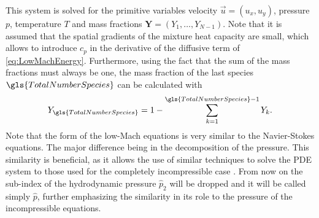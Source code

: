 This system is solved for the primitive variables velocity $\vec{u} = (u_x, u_y)$, pressure $p$, temperature $T$ and mass fractions ${\mathbf{Y} = (Y_1,\dots,Y_{N-1})}$. Note that it is assumed that the spatial gradients of the mixture heat capacity are small, which allows to introduce $c_p$ in the derivative of the diffusive term of \cref{eq:LowMachEnergy}. Furthermore, using the fact that the sum of the mass fractions must always be one, the mass fraction of the last species $\gls{TotalNumberSpecies}$ can be calculated with
\begin{align} \label{eq:MassFractionConstraint}
	Y_{\gls{TotalNumberSpecies}} = 1 - \sum_{k = 1}^{\gls{TotalNumberSpecies}-1}Y_k.
\end{align}
Note that the form of the low-Mach equations is very similar to the Navier-Stokes equations. The major difference being in the decomposition of the pressure. This similarity is beneficial, as it allows the use of similar techniques to solve the PDE system to those used for the completely incompressible case \parencite{keshtibanCompressibleFlowSolvers2003}. From now on the sub-index of the hydrodynamic pressure $\hat p_2$ will be dropped and it will be called simply $\hat p$, further emphasizing the similarity in its role to the pressure of the incompressible equations.

